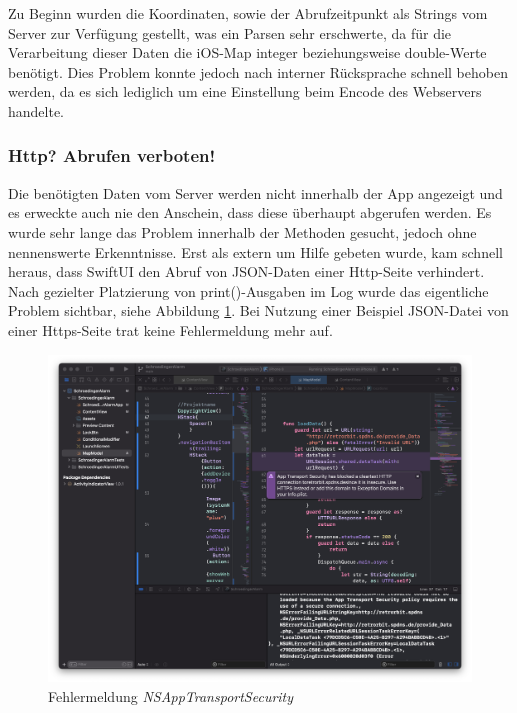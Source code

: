 Zu Beginn wurden die Koordinaten, sowie der Abrufzeitpunkt als Strings vom Server zur Verfügung gestellt, was ein Parsen sehr erschwerte, da für die Verarbeitung dieser Daten die iOS-Map integer beziehungsweise double-Werte benötigt. Dies Problem konnte jedoch nach interner Rücksprache schnell behoben werden, da es sich lediglich um eine Einstellung beim Encode des Webservers handelte.

\subsubsection{Http? Abrufen verboten!}

Die benötigten Daten vom Server werden nicht innerhalb der App angezeigt und es erweckte auch nie den Anschein, dass diese überhaupt abgerufen werden. Es wurde sehr lange das Problem innerhalb der Methoden gesucht, jedoch ohne nennenswerte Erkenntnisse. Erst als extern um Hilfe gebeten wurde, kam schnell heraus, dass SwiftUI den Abruf von JSON-Daten einer Http-Seite verhindert. Nach gezielter Platzierung von print()-Ausgaben im Log wurde das eigentliche Problem sichtbar, siehe Abbildung \ref{fehler}. Bei Nutzung einer Beispiel JSON-Datei von einer Https-Seite trat keine Fehlermeldung mehr auf.
\begin{figure} [H]
	\begin{center}
		\includegraphics[width=1\textwidth]{Bilder/iOS_fehlermeldung.png}
		\caption{Fehlermeldung \textit{NSAppTransportSecurity}}
		\label{fehler}
	\end{center}
\end{figure}
